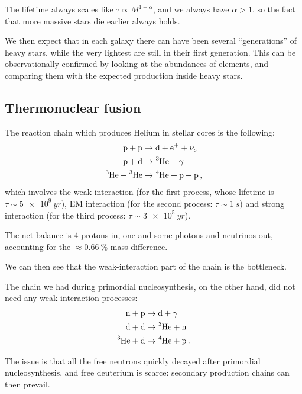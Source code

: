 \documentclass[main.tex]{subfiles}
\begin{document}
The lifetime always scales like \(\tau \propto M^{1 -\alpha }\), and we always have \(\alpha >1\), so the fact that more massive stars die earlier always holds.

We then expect that in each galaxy there can have been several ``generations'' of heavy stars, while the very lightest are still in their first generation. This can be observationally confirmed by looking at the abundances of elements, and comparing them with the expected production inside heavy stars. 

\subsection{Thermonuclear fusion}

The reaction chain which produces Helium in stellar cores is the following:
%
\begin{subequations}
\begin{align}
  \ce{p + p} &\rightarrow \ce{d + e+ +} \nu_e  \\
  \ce{p + d} &\rightarrow \ce{^3He} + \gamma  \\
  \ce{^3He + ^3He} &\rightarrow \ce{^4He + p + p} 
\,,
\end{align}
\end{subequations}
%
which involves the weak interaction (for the first process, whose lifetime is \(\tau \sim \SI{5e9}{yr}\)), EM interaction (for the second process: \(\tau \sim \SI{1}{s}\)) and strong interaction (for the third process: \(\tau \sim  \SI{3e5}{yr}\)).

The net balance is 4 protons in, one  and some photons and neutrinos out, accounting for the \(\approx \SI{0.66}{\percent}\) mass difference. 

We can then see that the weak-interaction part of the chain is the bottleneck.

The chain we had during primordial nucleosynthesis, on the other hand, did not need any weak-interaction processes:
%
\begin{subequations}
\begin{align}
  \ce{n + p} &\rightarrow \ce{d} + \gamma   \\
  \ce{d + d} &\rightarrow \ce{^3He + n}  \\
  \ce{^3He + d}  &\rightarrow \ce{^4He + p}
\,.
\end{align}
\end{subequations}

The issue is that all the free neutrons quickly decayed after primordial nucleosynthesis, and free deuterium is scarce: secondary production chains can then prevail. 

\end{document}
